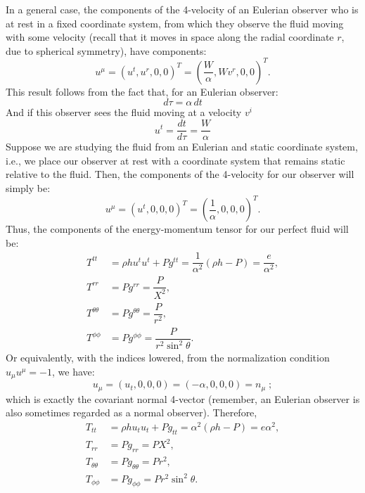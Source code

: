 \documentclass[12pt]{report}
\begin{document}
	In a general case, the components of the 4-velocity of an Eulerian observer who is at rest in a fixed coordinate system, from which they observe the fluid moving with some velocity (recall that it moves in space along the radial coordinate $r$, due to spherical symmetry), have components:
	\begin{equation}
		u^\mu = (u^t,u^r,0,0)^T = \left(\dfrac{W}{\alpha},Wv^r,0,0\right)^T.
	\end{equation}
	This result follows from the fact that, for an Eulerian observer:
	\begin{equation}
		d\tau = \alpha \,dt
	\end{equation}
	And if this observer sees the fluid moving at a velocity $v^i$
	\begin{equation}
		u^t = \dfrac{dt}{d\tau} = \dfrac{W}{\alpha}
	\end{equation}
	Suppose we are studying the fluid from an Eulerian and static coordinate system, i.e., we place our observer at rest with a coordinate system that remains static relative to the fluid. Then, the components of the 4-velocity for our observer will simply be:
	\begin{equation}
		u^\mu = (u^t,0,0,0)^T = \left(\dfrac{1}{\alpha},0,0,0\right)^T.
	\end{equation}
	Thus, the components of the energy-momentum tensor for our perfect fluid will be:
	\begin{align}
		T^{tt}&=\rho h u^t u^t + P g^{tt}= \dfrac{1}{\alpha^2}(\rho h - P)=\dfrac{e}{\alpha^2},\\
		T^{rr}&=Pg^{rr}=\dfrac{P}{X^2},\\
		T^{\theta\theta}&=Pg^{\theta\theta}=\dfrac{P}{r^2}, \\
		T^{\phi\phi}&=Pg^{\phi\phi}=\dfrac{P}{r^2\sin^2\theta}.
	\end{align}
	Or equivalently, with the indices lowered, from the normalization condition $u_\mu u^\mu=-1$, we have:
	\begin{equation}
		u_\mu = (u_t,0,0,0) = \left(-\alpha,0,0,0\right)=n_{\mu}\;;
	\end{equation}
	which is exactly the covariant normal 4-vector (remember, an Eulerian observer is also sometimes regarded as a normal observer). Therefore,
	\begin{align}
		T_{tt}&=\rho h u_t u_t + P g_{tt}= \alpha^2(\rho h - P)=e\alpha^2,\\
		T_{rr}&=Pg_{rr}=PX^2,\\
		T_{\theta\theta}&=Pg_{\theta\theta}=Pr^2, \\
		T_{\phi\phi}&=Pg_{\phi\phi}=Pr^2\sin^2\theta.
	\end{align}
\end{document}
